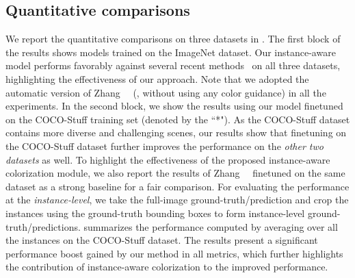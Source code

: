 \subsection{Quantitative comparisons}\label{sec:quantitative}
We report the quantitative comparisons on three datasets in . 
The first block of the results shows models trained on the ImageNet dataset.
Our instance-aware model performs favorably against several recent methods~\cite{Iizuka-SIGGRAPH-2016, larsson2017colorization, Zhang-ECCV-2016, Zhang-SIGGRAPH-2017, Deoldify, Lei-CVPR-2019} on all three datasets, highlighting the effectiveness of our approach.
Note that we adopted the automatic version of Zhang~\etal~\cite{Zhang-SIGGRAPH-2017} (\ie, without using any color guidance) in all the experiments.
In the second block, we show the results using our model finetuned on the COCO-Stuff training set (denoted by the ``*").
As the COCO-Stuff dataset contains more diverse and challenging scenes, our results show that finetuning on the COCO-Stuff dataset further improves the performance on the \emph{other two datasets} as well.
To highlight the effectiveness of the proposed instance-aware colorization module, we also report the results of Zhang~\etal~\cite{Zhang-SIGGRAPH-2017} finetuned on the same dataset as a strong baseline for a fair comparison.
For evaluating the performance at the \emph{instance-level}, we take the full-image ground-truth/prediction and crop the instances using the ground-truth bounding boxes to form instance-level ground-truth/predictions.
 summarizes the performance computed by averaging over all the instances on the COCO-Stuff dataset.
The results present a significant performance boost gained by our method in all metrics, which further highlights the contribution of instance-aware colorization to the improved performance.

